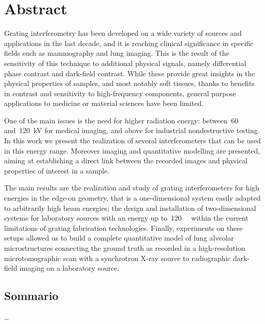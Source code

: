 \begingroup
\let\clearpage\relax
\let\cleardoublepage\relax
\let\cleardoublepage\relax

\chapter*{Abstract}
Grating interferometry has been developed on a wide variety of sources and
applications in the last decade, and it is reaching clinical significance in
specific fields such as mammography and lung imaging. This is the
result of the sensitivity of this technique to additional physical signals,
namely differential phase contrast and dark-field contrast. While these
provide great insights in the physical properties of samples, and most
notably soft tissues, thanks to benefits in contrast and sensitivity to
high-frequency components, general purpose applications to medicine or
material sciences have been limited.

One of the main issues is the need for higher radiation energy:
between~\num{60} and~\SI{120}{\kilo\volt} for medical imaging, and above for
industrial nondestructive testing. In this work we present the realization
of several interferometers that can be used in this energy range. Moreover
imaging and quantitative modelling are presented, aiming at establishing a
direct link between the recorded images and physical properties of interest
in a sample.

The main results are the realization and study of grating interferometers for
high energies in the edge-on geometry, that is a one-dimensional system
easily adapted to arbitrarily high beam energies; the design and
installation of
two-dimensional systems for laboratory sources with an energy up
to~\SI{120}{\kilo\voltpeak} within the current limitations of grating
fabrication technologies. Finally, experiments on these setups allowed us
to build a complete quantitative model of lung alveolar
microstructures connecting the ground truth as recorded in a high-resolution
microtomographic scan with a synchrotron X-ray source to radiographic
dark-field imaging on a laboratory source.

\newpage

\begin{otherlanguage}{italian}
\chapter*{Sommario}
\dots
\end{otherlanguage}

\endgroup

\vfill
